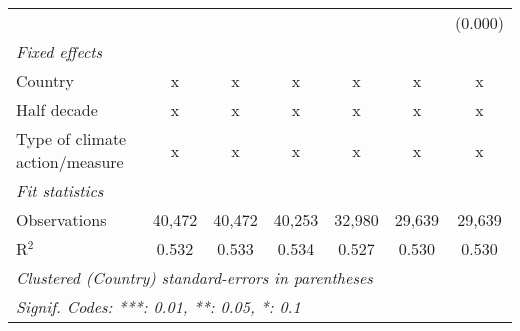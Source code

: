 \begin{tabular}{lcccccc}
                                                             &         &               &               &               &               & (0.000)\\   
   \emph{Fixed effects}\\
   Country                                                   & x       & x             & x             & x             & x             & x\\  
   Half decade                                               & x       & x             & x             & x             & x             & x\\  
   Type of climate action/measure                            & x       & x             & x             & x             & x             & x\\  
   \midrule \emph{Fit statistics}\\
   Observations                                              & 40,472  & 40,472        & 40,253        & 32,980        & 29,639        & 29,639\\  
   R$^2$                                                     & 0.532   & 0.533         & 0.534         & 0.527         & 0.530         & 0.530\\  
   \midrule
   \multicolumn{7}{l}{\emph{Clustered (Country) standard-errors in parentheses}}\\
   \multicolumn{7}{l}{\emph{Signif. Codes: ***: 0.01, **: 0.05, *: 0.1}}\\
\end{tabular}
\par\endgroup


